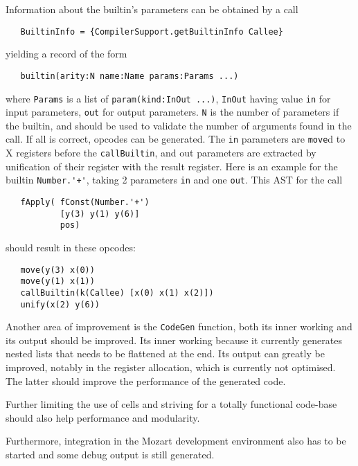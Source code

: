 \documentclass[a4paper]{memoir}
\begin{document}
Information about the builtin's parameters can be obtained by a call
\begin{lstlisting}
   BuiltinInfo = {CompilerSupport.getBuiltinInfo Callee}
\end{lstlisting}
yielding a record of the form
\begin{lstlisting}
   builtin(arity:N name:Name params:Params ...)
\end{lstlisting}
where \lstinline!Params! is a list of \lstinline!param(kind:InOut ...)!,
\lstinline!InOut! having value \lstinline!in! for input parameters,
\lstinline!out! for output parameters.
\lstinline!N! is the number of parameters if the builtin, and should be used to 
validate the number of arguments found in the call. If all is correct, opcodes can be generated.
The \lstinline!in! parameters are \lstinline!move!d to X registers before the \lstinline!callBuiltin!, and out parameters are
extracted by unification of their register with the result register. 
Here is an example for the builtin \lstinline!Number.'+'!, taking 2 parameters
\lstinline!in! and one \lstinline!out!. This AST for the call
\begin{lstlisting}
   fApply( fConst(Number.'+') 
           [y(3) y(1) y(6)] 
           pos)
\end{lstlisting}
should result in these opcodes:
\begin{lstlisting}
   move(y(3) x(0))
   move(y(1) x(1))
   callBuiltin(k(Callee) [x(0) x(1) x(2)])
   unify(x(2) y(6))
\end{lstlisting}

Another area of improvement is the \lstinline!CodeGen! function, both its inner working and its output should be improved.
Its inner working because it currently generates nested lists that needs to be flattened at the end. Its output can greatly be improved, 
notably in the register allocation, which is currently not optimised. The latter should improve the performance of the generated code.

Further limiting the use of cells and striving for a totally functional code-base should also help 
performance and modularity.

Furthermore, integration in the Mozart development environment also has to be started and some debug output is still generated.
\end{document}
